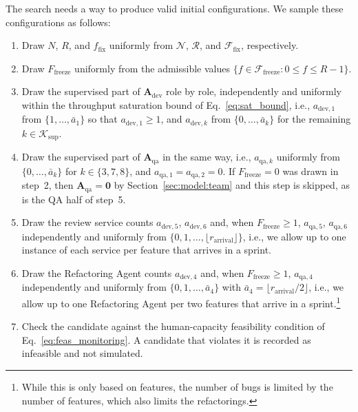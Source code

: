 \documentclass[smallextended]{svjour3}       %
\begin{document}
The search needs a way to produce valid initial configurations. We sample these configurations as follows:
\begin{enumerate}
  \item Draw $N$, $R$, and $f_\mathrm{fix}$ uniformly from $\mathcal{N}$, $\mathcal{R}$, and $\mathcal{F}_\mathrm{fix}$, respectively.
  \item Draw $F_\mathrm{freeze}$ uniformly from the admissible values
        $\{f \in \mathcal{F}_\mathrm{freeze} : 0 \leq f \leq R-1\}$.
  \item Draw the supervised part of $\mathbf{A}_\mathrm{dev}$ role by role, independently and
        uniformly within the throughput saturation bound of Eq.~\eqref{eq:sat_bound}, i.e.,
        $a_{\mathrm{dev},1}$ from $\{1, \ldots, \bar{a}_1\}$ so that
        $a_{\mathrm{dev},1} \geq 1$, and $a_{\mathrm{dev},k}$ from
        $\{0, \ldots, \bar{a}_k\}$ for the remaining $k \in \mathcal{K}_\mathrm{sup}$.
  \item Draw the supervised part of $\mathbf{A}_\mathrm{qa}$ in the same way, i.e.,
        $a_{\mathrm{qa},k}$ uniformly from $\{0, \ldots, \bar{a}_k\}$ for
        $k \in \{3,7,8\}$, and $a_{\mathrm{qa},1} = a_{\mathrm{qa},2} = 0$. If
        $F_\mathrm{freeze} = 0$ was drawn in step~2, then $\mathbf{A}_\mathrm{qa} = \mathbf{0}$
        by Section~\ref{sec:model:team} and this step is skipped, as is the QA half of
        step~5.
  \item Draw the review service counts $a_{\mathrm{dev},5}$, $a_{\mathrm{dev},6}$ and,
        when $F_\mathrm{freeze} \geq 1$, $a_{\mathrm{qa},5}$, $a_{\mathrm{qa},6}$
        independently and uniformly from
        $\{0, 1, \ldots, \lfloor r_\mathrm{arrival} \rfloor\}$, i.e., we allow up to one instance
        of each service per feature that arrives in a sprint.
  \item Draw the Refactoring Agent counts $a_{\mathrm{dev},4}$ and, when $F_\mathrm{freeze} \geq 1$,
        $a_{\mathrm{qa},4}$ independently and uniformly from 
        $\{0, 1, \ldots, \bar{a}_4\}$ with $\bar{a}_4 = \lfloor r_\mathrm{arrival}/2 \rfloor$,
        i.e., we allow up to one Refactoring Agent per two features that arrive in a sprint.\footnote{While this is only based on features, the number of bugs is limited by the number of features, which also limits the refactorings.}
  \item Check the candidate against the human-capacity feasibility condition of
        Eq.~\eqref{eq:feas_monitoring}. A candidate that violates it is recorded as
        infeasible and not simulated.
\end{enumerate}
\end{document}

